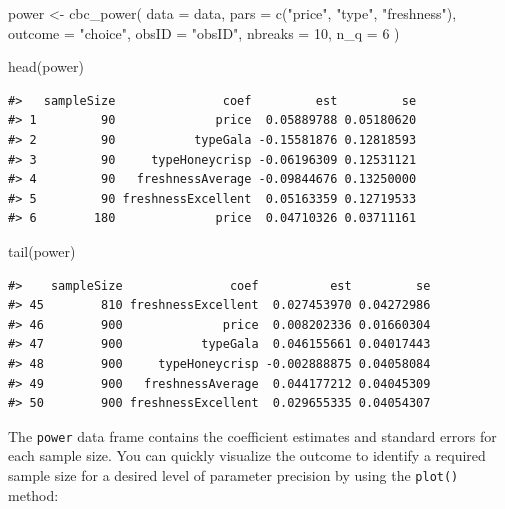 \documentclass[
  12pt,
]{article}
\newenvironment{Shaded}{\begin{snugshade}}{\end{snugshade}}
\newcommand{\AttributeTok}[1]{\textcolor[rgb]{0.77,0.63,0.00}{#1}}
\newcommand{\DecValTok}[1]{\textcolor[rgb]{0.00,0.00,0.81}{#1}}
\newcommand{\FunctionTok}[1]{\textcolor[rgb]{0.00,0.00,0.00}{#1}}
\newcommand{\NormalTok}[1]{#1}
\newcommand{\OtherTok}[1]{\textcolor[rgb]{0.56,0.35,0.01}{#1}}
\newcommand{\StringTok}[1]{\textcolor[rgb]{0.31,0.60,0.02}{#1}}
\begin{document}
\begin{Shaded}
\begin{Highlighting}[]
\NormalTok{power }\OtherTok{\textless{}{-}} \FunctionTok{cbc\_power}\NormalTok{(}
  \AttributeTok{data    =}\NormalTok{ data,}
  \AttributeTok{pars    =} \FunctionTok{c}\NormalTok{(}\StringTok{"price"}\NormalTok{, }\StringTok{"type"}\NormalTok{, }\StringTok{"freshness"}\NormalTok{),}
  \AttributeTok{outcome =} \StringTok{"choice"}\NormalTok{,}
  \AttributeTok{obsID   =} \StringTok{"obsID"}\NormalTok{,}
  \AttributeTok{nbreaks =} \DecValTok{10}\NormalTok{,}
  \AttributeTok{n\_q     =} \DecValTok{6}
\NormalTok{)}

\FunctionTok{head}\NormalTok{(power)}
\end{Highlighting}
\end{Shaded}

\begin{verbatim}
#>   sampleSize               coef         est         se
#> 1         90              price  0.05889788 0.05180620
#> 2         90           typeGala -0.15581876 0.12818593
#> 3         90     typeHoneycrisp -0.06196309 0.12531121
#> 4         90   freshnessAverage -0.09844676 0.13250000
#> 5         90 freshnessExcellent  0.05163359 0.12719533
#> 6        180              price  0.04710326 0.03711161
\end{verbatim}

\begin{Shaded}
\begin{Highlighting}[]
\FunctionTok{tail}\NormalTok{(power)}
\end{Highlighting}
\end{Shaded}

\begin{verbatim}
#>    sampleSize               coef          est         se
#> 45        810 freshnessExcellent  0.027453970 0.04272986
#> 46        900              price  0.008202336 0.01660304
#> 47        900           typeGala  0.046155661 0.04017443
#> 48        900     typeHoneycrisp -0.002888875 0.04058084
#> 49        900   freshnessAverage  0.044177212 0.04045309
#> 50        900 freshnessExcellent  0.029655335 0.04054307
\end{verbatim}

The \texttt{power} data frame contains the coefficient estimates and
standard errors for each sample size. You can quickly visualize the
outcome to identify a required sample size for a desired level of
parameter precision by using the \texttt{plot()} method:
\end{document}
